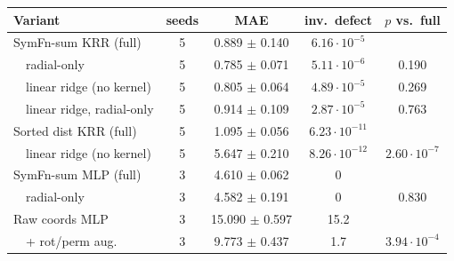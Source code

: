 \begin{tabular}{lcccc}
\toprule
Variant & seeds & MAE & inv.\ defect & $p$ vs.\ full \\
\midrule
SymFn-sum KRR (full) & 5 & 0.889 $\pm$ 0.140 & $6.16\cdot10^{-5}$ &  \\
\ \ radial-only & 5 & 0.785 $\pm$ 0.071 & $5.11\cdot10^{-6}$ & 0.190 \\
\ \ linear ridge (no kernel) & 5 & 0.805 $\pm$ 0.064 & $4.89\cdot10^{-5}$ & 0.269 \\
\ \ linear ridge, radial-only & 5 & 0.914 $\pm$ 0.109 & $2.87\cdot10^{-5}$ & 0.763 \\
Sorted dist KRR (full) & 5 & 1.095 $\pm$ 0.056 & $6.23\cdot10^{-11}$ &  \\
\ \ linear ridge (no kernel) & 5 & 5.647 $\pm$ 0.210 & $8.26\cdot10^{-12}$ & $2.60\cdot10^{-7}$ \\
SymFn-sum MLP (full) & 3 & 4.610 $\pm$ 0.062 & 0 &  \\
\ \ radial-only & 3 & 4.582 $\pm$ 0.191 & 0 & 0.830 \\
Raw coords MLP & 3 & 15.090 $\pm$ 0.597 & 15.2 &  \\
\ \ + rot/perm aug. & 3 & 9.773 $\pm$ 0.437 & 1.7 & $3.94\cdot10^{-4}$ \\
\bottomrule
\end{tabular}